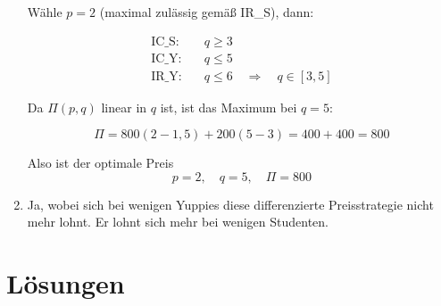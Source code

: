 \begin{solution}
\begin{enumerate}
Wähle $p = 2$ (maximal zulässig gemäß IR\_S), dann:

\begin{align*}
\text{IC\_S:} \quad & q \geq 3 \\
\text{IC\_Y:} \quad & q \leq 5 \\
\text{IR\_Y:} \quad & q \leq 6 \quad \Rightarrow \quad q \in [3, 5]
\end{align*}

Da $\Pi(p, q)$ linear in $q$ ist, ist das Maximum bei $q = 5$:

\[
\Pi = 800(2 - 1{,}5) + 200(5 - 3) = 400 + 400 = \boxed{800}
\]

Also ist der optimale Preis
\[
\boxed{p = 2}, \quad \boxed{q = 5}, \quad \boxed{\Pi = 800}
\]
\item Ja, wobei sich bei wenigen Yuppies diese differenzierte Preisstrategie nicht mehr lohnt. Er lohnt sich mehr bei wenigen Studenten. 
    \end{enumerate}
\end{solution}


\clearpage
\section{Lösungen}

\printsolutions
